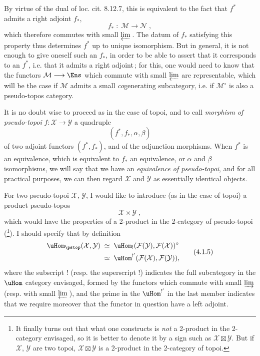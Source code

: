 By virtue of the dual of loc. cit. 8.12.7, this is equivalent to the fact that $f^*$ admits a right adjoint $f_*$,
\[
f_* \;:\; \mathcal{M} \longrightarrow \mathcal{N}\;,
\tag*{(4.1.2)}
\]
which therefore commutes with small $\varprojlim$\,. The datum of $f_*$ satisfying this property thus determines $f^*$ up to unique isomorphism. But in general, it is not enough to give oneself such an $f_*$, in order to be able to assert that it corresponds to an $f^*$, i.e. that it admits a right adjoint\,; for this, one would need to know that the functors $\mathcal{M}\longrightarrow\Ens$ which commute with small $\varprojlim$ are representable, which will be the case if $\mathcal{M}$ admits a small \textit{co}generating subcategory, i.e. if $\mathcal{M}^\circ$ is also a pseudo-topos category. %

\newpage


It is no doubt wise to proceed as in the case of topoi, and to call \textit{morphism of pseudo-topoi} $f:\mathcal{X}\longrightarrow\mathcal{Y}$ a quadruple
\[
(f^*,f_*,\alpha,\beta)
\tag*{(4.1.3)}
\]
of two adjoint functors $(f^*,f_*)$, and of the adjunction morphisms. When $f^*$ is an equivalence, which is equivalent to $f_*$ an equivalence, or $\alpha$ and $\beta$ isomorphisms, we will say that we have an \textit{equivalence of pseudo-topoi}, and for all practical purposes, we can then regard $\mathcal{X}$ and $\mathcal{Y}$ as essentially identical objects.

For two pseudo-topoi $\mathcal{X}$, $\mathcal{Y}$, I would like to introduce (as in the case of topoi) a product pseudo-topos
\[
\mathcal{X}\times\mathcal{Y}\;,
\tag*{(4.1.4)}
\]
which would have the properties of a 2-product in the 2-category of pseudo-topoi (\footnote{It finally turns out that what one constructs is \textit{not} a 2-product in the 2-category envisaged, so it is better to denote it by a sign such as $\mathcal{X}\boxtimes\mathcal{Y}$. But if $\mathcal{X}$, $\mathcal{Y}$ are two topoi, $\mathcal{X}\boxtimes\mathcal{Y}$ is a 2-product in the 2-category of topoi.}). I should specify that by definition
\[
\begin{aligned}
\uHom_{\pstop}(\mathcal{X},\mathcal{Y}) \;&\simeq\; \uHom_!(\mathcal{F}(\mathcal{Y}),\mathcal{F}(\mathcal{X}))^\circ\\
&\simeq\; \uHom^{!'}(\mathcal{F}(\mathcal{X}),\mathcal{F}(\mathcal{Y})),
\end{aligned}
\tag*{(4.1.5)}
\]
where the subscript ! (resp. the superscript !) indicates the full subcategory in the $\uHom$ category envisaged, formed by the functors which commute with small $\varinjlim$ (resp. with small
$\varprojlim$\,), and the prime in the $\uHom^{!'}$ in the last member indicates that we require moreover that the functor in question have a left adjoint.

